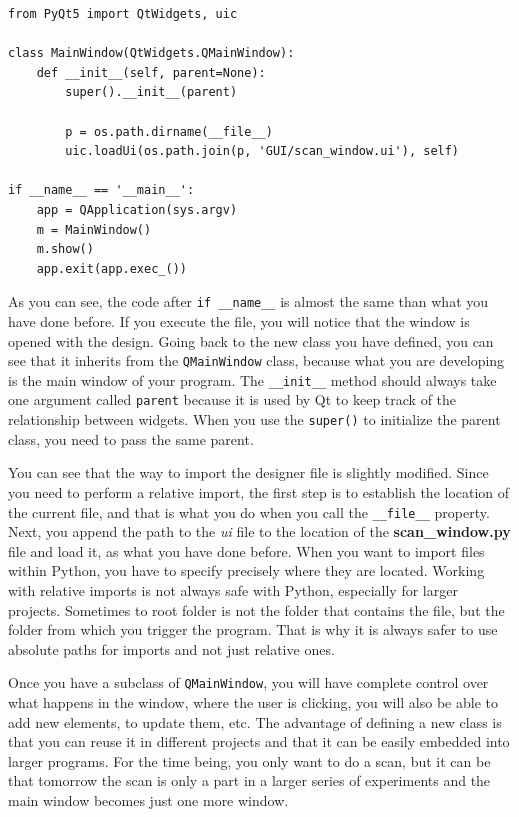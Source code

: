 \begin{verbatim}
from PyQt5 import QtWidgets, uic

class MainWindow(QtWidgets.QMainWindow):
    def __init__(self, parent=None):
        super().__init__(parent)

        p = os.path.dirname(__file__)
        uic.loadUi(os.path.join(p, 'GUI/scan_window.ui'), self)

if __name__ == '__main__':
    app = QApplication(sys.argv)
    m = MainWindow()
    m.show()
    app.exit(app.exec_())
\end{verbatim}

As you can see, the code after \texttt{if __name__} is almost the
same than what you have done before. If you execute the file, you will
notice that the window is opened with the design. Going back to the new
class you have defined, you can see that it inherits from the
\texttt{QMainWindow} class, because what you are developing is the main
window of your program. The \texttt{__init__} method should always
take one argument called \texttt{parent} because it is used by Qt to
keep track of the relationship between widgets. When you use the
\texttt{super()} to initialize the parent class, you need to pass the
same parent.

You can see that the way to import the designer file is slightly
modified. Since you need to perform a relative import, the first step is
to establish the location of the current file, and that is what you do
when you call the \texttt{__file__} property. Next, you append the
path to the \emph{ui} file to the location of the
\textbf{scan\_window.py} file and load it, as what you have done before.
When you want to import files within Python, you have to specify
precisely where they are located. Working with relative imports is not
always safe with Python, especially for larger projects. Sometimes to
root folder is not the folder that contains the file, but the folder
from which you trigger the program. That is why it is always safer to
use absolute paths for imports and not just relative ones.

Once you have a subclass of \texttt{QMainWindow}, you will have complete
control over what happens in the window, where the user is clicking, you
will also be able to add new elements, to update them, etc. The advantage of defining a new class is that you can reuse it in different
projects and that it can be easily embedded into larger programs. For
the time being, you only want to do a scan, but it can be that tomorrow
the scan is only a part in a larger series of experiments and the main
window becomes just one more window.

